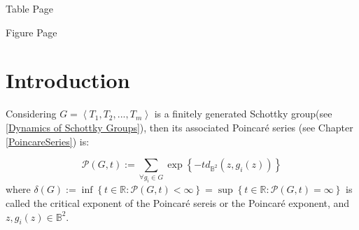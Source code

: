 \documentclass[12pt,oneside]{sfsuthesis}
\theoremstyle{plain} %
\theoremstyle{definition}  %
\theoremstyle{remark}  %
\theoremstyle{plain}
\begin{document}
{\newpage \tableofcontents 
\newpage Table \hfill Page \listoftables %
\newpage Figure \hfill Page \listoffigures %

\newpage
\pagestyle{myheadings}
\setcounter{page}{1}


%

\chapter{Introduction}


Considering $G=\left\langle T_1, T_2,...,T_m\right\rangle$ is a finitely generated Schottky group(see \ref{Dynamics of Schottky Groups}), then its associated Poincar\'{e} series (see Chapter \ref{PoincareSeries}) is: 

$$
\mathcal{P}(G,t):=\sum\limits_{\forall g_i\in G}\exp\left\lbrace -td_{\mathbb{B}^2}(z,g_i(z)) \right\rbrace
$$
where $\delta(G):=\inf\left\lbrace t\in\mathbb{R}:\mathcal{P}(G,t)<\infty \right\rbrace = \sup\left\lbrace t\in\mathbb{R}:\mathcal{P}(G,t)=\infty\right\rbrace$ is called the critical exponent of the Poincar\'{e} sereis or the Poincar\'{e} exponent, and $z,g_i(z)\in \mathbb{B}^2$. 

}
\end{document}
